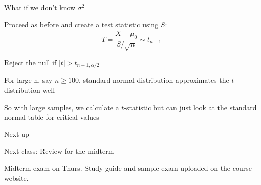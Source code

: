 \documentclass{./../div_teaching_slides}
\begin{document}
\begin{frame}{What if we don't know $\sigma^2$}
\begin{witemize}
  \item Proceed as before and create a test statistic using $S$:
 $$ T = \frac{\bar{X}-\mu_0}{S/\sqrt{n}} \sim t_{n-1} $$ 
\item Reject the null if $|t|> t_{n-1, \alpha/2}$
\item For large n, say $n \geq 100$, standard normal distribution approximates the $t$-distribution well
\item So with large samples, we calculate a $t$-statistic but can just look at the standard normal table for critical values
\end{witemize}
\end{frame}

\begin{frame}{Next up}
\vspace{-0.5em}
\begin{witemize}
  \item Next class: Review for the midterm
  \item Midterm exam on Thurs. Study guide and sample exam uploaded on the course website.
\end{witemize}
\end{frame}
\end{document}

